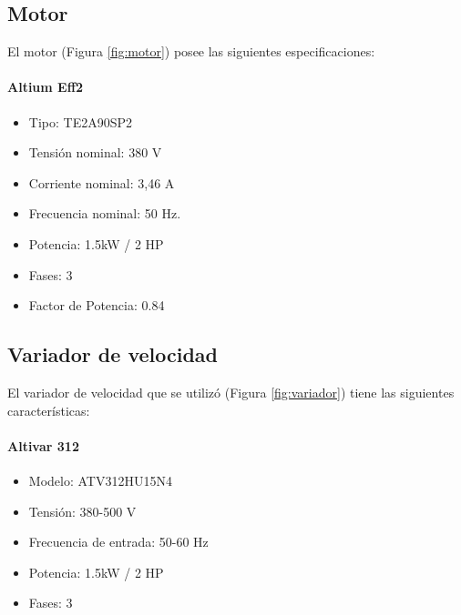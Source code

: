 \subsection{Motor}


El motor (Figura \ref{fig:motor}) posee las siguientes especificaciones:  \\
\paragraph*{Altium Eff2}

\begin{minipage}[t]{.5\textwidth}
	\begin{itemize}
		\item Tipo: TE2A90SP2
		\item Tensión nominal: 380 V
		\item Corriente nominal: 3,46 A
		\item Frecuencia nominal:  50 Hz.
		\item Potencia: 1.5kW / 2 HP
		\item Fases: 3
		\item Factor de Potencia: 0.84
	\end{itemize}
\end{minipage}
\begin{minipage}[t]{.5\textwidth}
	\centering{}
	\label{fig:motor}

\end{minipage}

\subsection{Variador de velocidad}



El variador de velocidad que se utilizó (Figura \ref{fig:variador}) tiene las siguientes características:
\paragraph*{Altivar 312}
\begin{minipage}[t]{.5\textwidth}
	\begin{itemize}
		\item 	Modelo: ATV312HU15N4
		\item   Tensión: 380-500 V
		\item 	Frecuencia de entrada: 50-60 Hz
		\item 	Potencia: 1.5kW / 2 HP
		\item 	Fases: 3
	\end{itemize}
\end{minipage}
\begin{minipage}[t]{.5\textwidth}
	\centering{}
	\label{fig:variador}
\end{minipage}


